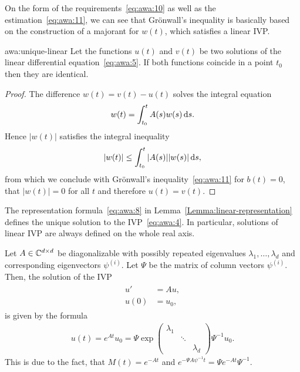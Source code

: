 
\begin{remark}
	On the form of the requirements~\eqref{eq:awa:10} as well as the
  estimation~\eqref{eq:awa:11}, we can see that Grönwall's
  inequality is basically based on the construction of a majorant for 
	$w(t)$, which satisfies a linear IVP.
\end{remark}

\begin{Corollary}{awa:unique-linear}
  Let the functions $u(t)$ and $v(t)$ be two solutions of the linear
  differential equation~\eqref{eq:awa:5}. If both functions
  coincide in a point $t_0$ then they are identical.
\end{Corollary}

\begin{proof}
	The difference $w(t) = v(t) - u(t)$ solves the integral equation
  \begin{gather*}
    w(t) = \int_{t_0}^t A(s) w(s) \,\mathrm{d} s.
  \end{gather*}
  Hence $|w(t)|$ satisfies the integral inequality
  \begin{gather*}
    |w(t)| \le \int_{t_0}^t |A(s)| |w(s)| \,\mathrm{d} s,
  \end{gather*}
	from which we conclude with Grönwall's inequality~\eqref{eq:awa:11} 
	for $b(t) = 0$, that $|w(t)|=0$ for all $t$ and therefore
  $u(t) = v(t)$.
\end{proof}

\begin{corollary}
  The representation formula~\eqref{eq:awa:8} in
  Lemma~\ref{Lemma:linear-representation} defines the unique solution to the
  IVP~\eqref{eq:awa:4}. In particular, solutions of linear IVP are
  always defined on the whole real axis.
\end{corollary}

\begin{example}
  Let $A \in \mathbb C^{d\times d}$ be diagonalizable with possibly repeated
  eigenvalues $\lambda_1,\dots,\lambda_d$ and corresponding
  eigenvectors $\psi^{(i)}$. Let $\Psi$ be the matrix of column
  vectors $\psi^{(i)}$. Then, the solution of the IVP
  \begin{gather*}
    \begin{split}
      u' &= A u,\\
      u(0) &= u_0,
    \end{split}
  \end{gather*}
  is given by the formula
  \begin{gather*}
    u(t) = e^{At} u_0 = \Psi \exp
    \begin{pmatrix}
      \lambda_1\\&\ddots\\&&\lambda_d
    \end{pmatrix}
    \Psi^{-1} u_0.
  \end{gather*}
  This is due to the fact, that $M(t) = e^{-At}$ and $e^{-\Psi A
    \psi^{-1}t} = \Psi e^{-At} \Psi^{-1}$.
\end{example}

